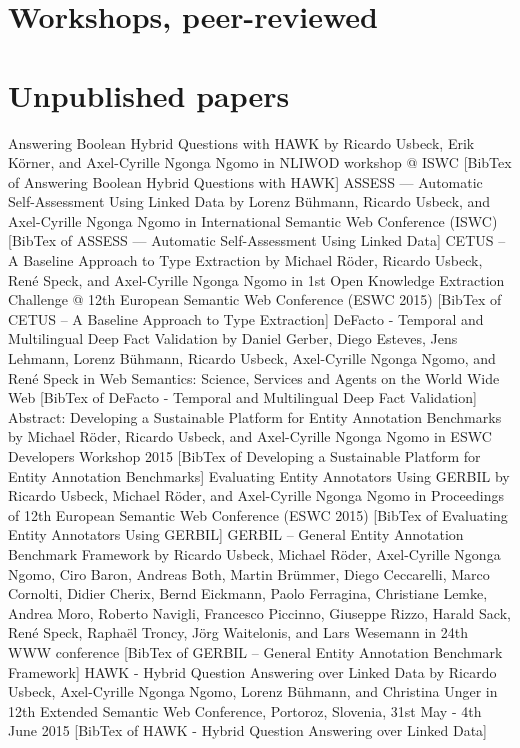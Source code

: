\section*{Workshops, peer-reviewed}

\section*{Unpublished papers}


Answering Boolean Hybrid Questions with HAWK by Ricardo Usbeck, Erik Körner, and Axel-Cyrille Ngonga Ngomo in NLIWOD workshop @ ISWC [BibTex of Answering Boolean Hybrid Questions with HAWK]
ASSESS --- Automatic Self-Assessment Using Linked Data by Lorenz Bühmann, Ricardo Usbeck, and Axel-Cyrille Ngonga Ngomo in International Semantic Web Conference (ISWC) [BibTex of ASSESS --- Automatic Self-Assessment Using Linked Data]
CETUS -- A Baseline Approach to Type Extraction by Michael Röder, Ricardo Usbeck, René Speck, and Axel-Cyrille Ngonga Ngomo in 1st Open Knowledge Extraction Challenge @ 12th European Semantic Web Conference (ESWC 2015) [BibTex of CETUS -- A Baseline Approach to Type Extraction]
DeFacto - Temporal and Multilingual Deep Fact Validation by Daniel Gerber, Diego Esteves, Jens Lehmann, Lorenz Bühmann, Ricardo Usbeck, Axel-Cyrille Ngonga Ngomo, and René Speck in Web Semantics: Science, Services and Agents on the World Wide Web [BibTex of DeFacto - Temporal and Multilingual Deep Fact Validation] 
Abstract:
Developing a Sustainable Platform for Entity Annotation Benchmarks by Michael Röder, Ricardo Usbeck, and Axel-Cyrille Ngonga Ngomo in ESWC Developers Workshop 2015 [BibTex of Developing a Sustainable Platform for Entity Annotation Benchmarks]
Evaluating Entity Annotators Using GERBIL by Ricardo Usbeck, Michael Röder, and Axel-Cyrille Ngonga Ngomo in Proceedings of 12th European Semantic Web Conference (ESWC 2015) [BibTex of Evaluating Entity Annotators Using GERBIL]
GERBIL -- General Entity Annotation Benchmark Framework by Ricardo Usbeck, Michael Röder, Axel-Cyrille Ngonga Ngomo, Ciro Baron, Andreas Both, Martin Brümmer, Diego Ceccarelli, Marco Cornolti, Didier Cherix, Bernd Eickmann, Paolo Ferragina, Christiane Lemke, Andrea Moro, Roberto Navigli, Francesco Piccinno, Giuseppe Rizzo, Harald Sack, René Speck, Raphaël Troncy, Jörg Waitelonis, and Lars Wesemann in 24th WWW conference [BibTex of GERBIL -- General Entity Annotation Benchmark Framework]
HAWK - Hybrid Question Answering over Linked Data by Ricardo Usbeck, Axel-Cyrille Ngonga Ngomo, Lorenz Bühmann, and Christina Unger in 12th Extended Semantic Web Conference, Portoroz, Slovenia, 31st May - 4th June 2015 [BibTex of HAWK - Hybrid Question Answering over Linked Data]
